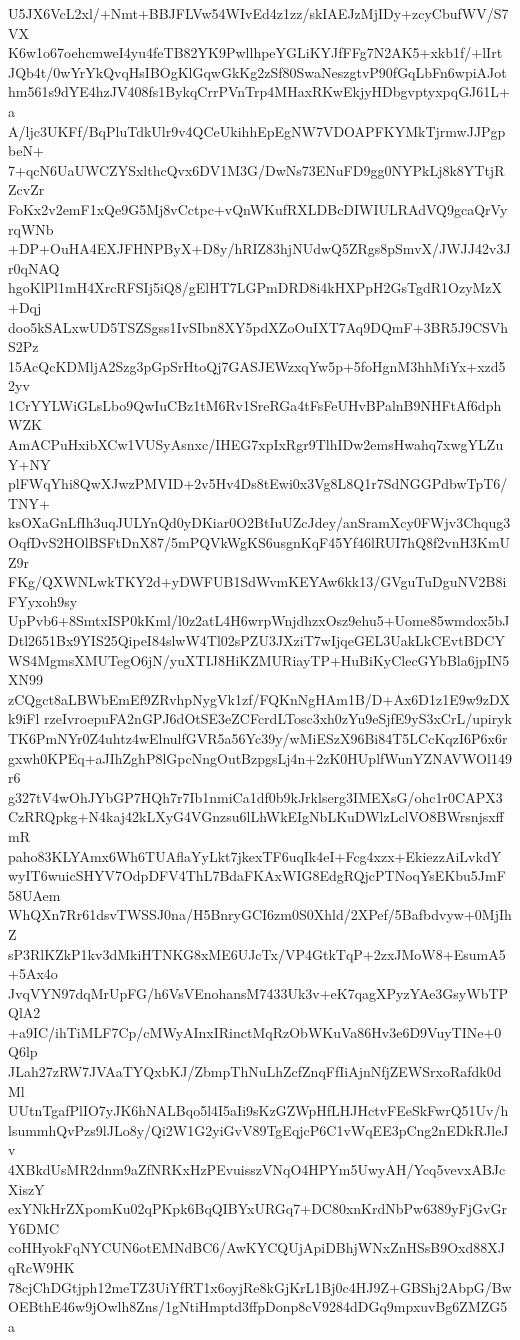 U5JX6VcL2xl/+Nmt+BBJFLVw54WIvEd4z1zz/skIAEJzMjIDy+zcyCbufWV/S7VX
K6w1o67oehcmweI4yu4feTB82YK9PwllhpeYGLiKYJfFFg7N2AK5+xkb1f/+lIrt
JQb4t/0wYrYkQvqHsIBOgKlGqwGkKg2zSf80SwaNeszgtvP90fGqLbFn6wpiAJot
hm561s9dYE4hzJV408fs1BykqCrrPVnTrp4MHaxRKwEkjyHDbgvptyxpqGJ61L+a
A/ljc3UKFf/BqPluTdkUlr9v4QCeUkihhEpEgNW7VDOAPFKYMkTjrmwJJPgpbeN+
7+qcN6UaUWCZYSxlthcQvx6DV1M3G/DwNs73ENuFD9gg0NYPkLj8k8YTtjRZcvZr
FoKx2v2emF1xQe9G5Mj8vCctpc+vQnWKufRXLDBcDIWIULRAdVQ9gcaQrVyrqWNb
+DP+OuHA4EXJFHNPByX+D8y/hRIZ83hjNUdwQ5ZRgs8pSmvX/JWJJ42v3Jr0qNAQ
hgoKlPl1mH4XrcRFSIj5iQ8/gElHT7LGPmDRD8i4kHXPpH2GsTgdR1OzyMzX+Dqj
doo5kSALxwUD5TSZSgss1IvSIbn8XY5pdXZoOuIXT7Aq9DQmF+3BR5J9CSVhS2Pz
15AcQcKDMljA2Szg3pGpSrHtoQj7GASJEWzxqYw5p+5foHgnM3hhMiYx+xzd52yv
1CrYYLWiGLsLbo9QwIuCBz1tM6Rv1SreRGa4tFsFeUHvBPalnB9NHFtAf6dphWZK
AmACPuHxibXCw1VUSyAsnxc/IHEG7xpIxRgr9TlhIDw2emsHwahq7xwgYLZuY+NY
plFWqYhi8QwXJwzPMVID+2v5Hv4Ds8tEwi0x3Vg8L8Q1r7SdNGGPdbwTpT6/TNY+
ksOXaGnLfIh3uqJULYnQd0yDKiar0O2BtIuUZcJdey/anSramXcy0FWjv3Chqug3
OqfDvS2HOlBSFtDnX87/5mPQVkWgKS6usgnKqF45Yf46lRUI7hQ8f2vnH3KmUZ9r
FKg/QXWNLwkTKY2d+yDWFUB1SdWvmKEYAw6kk13/GVguTuDguNV2B8iFYyxoh9sy
UpPvb6+8SmtxISP0kKml/l0z2atL4H6wrpWnjdhzxOsz9ehu5+Uome85wmdox5bJ
Dtl2651Bx9YIS25QipeI84slwW4Tl02sPZU3JXziT7wIjqeGEL3UakLkCEvtBDCY
WS4MgmsXMUTegO6jN/yuXTIJ8HiKZMURiayTP+HuBiKyClecGYbBla6jpIN5XN99
zCQgct8aLBWbEmEf9ZRvhpNygVk1zf/FQKnNgHAm1B/D+Ax6D1z1E9w9zDXk9iFl
rzeIvroepuFA2nGPJ6dOtSE3eZCFcrdLTosc3xh0zYu9eSjfE9yS3xCrL/upiryk
TK6PmNYr0Z4uhtz4wElnulfGVR5a56Yc39y/wMiESzX96Bi84T5LCcKqzI6P6x6r
gxwh0KPEq+aJIhZghP8lGpcNngOutBzpgsLj4n+2zK0HUplfWunYZNAVWOl149r6
g327tV4wOhJYbGP7HQh7r7Ib1nmiCa1df0b9kJrklserg3IMEXsG/ohc1r0CAPX3
CzRRQpkg+N4kaj42kLXyG4VGnzsu6lLhWkEIgNbLKuDWlzLclVO8BWrsnjsxffmR
paho83KLYAmx6Wh6TUAflaYyLkt7jkexTF6uqIk4eI+Fcg4xzx+EkiezzAiLvkdY
wyIT6wuicSHYV7OdpDFV4ThL7BdaFKAxWIG8EdgRQjcPTNoqYsEKbu5JmF58UAem
WhQXn7Rr61dsvTWSSJ0na/H5BnryGCI6zm0S0Xhld/2XPef/5Bafbdvyw+0MjIhZ
sP3RlKZkP1kv3dMkiHTNKG8xME6UJcTx/VP4GtkTqP+2zxJMoW8+EsumA5+5Ax4o
JvqVYN97dqMrUpFG/h6VsVEnohansM7433Uk3v+eK7qagXPyzYAe3GsyWbTPQlA2
+a9IC/ihTiMLF7Cp/cMWyAInxIRinctMqRzObWKuVa86Hv3e6D9VuyTINe+0Q6lp
JLah27zRW7JVAaTYQxbKJ/ZbmpThNuLhZcfZnqFfIiAjnNfjZEWSrxoRafdk0dMl
UUtnTgafPlIO7yJK6hNALBqo5l4I5aIi9sKzGZWpHfLHJHctvFEeSkFwrQ51Uv/h
lsummhQvPzs9lJLo8y/Qi2W1G2yiGvV89TgEqjcP6C1vWqEE3pCng2nEDkRJleJv
4XBkdUsMR2dnm9aZfNRKxHzPEvuisszVNqO4HPYm5UwyAH/Ycq5vevxABJcXiszY
exYNkHrZXpomKu02qPKpk6BqQIBYxURGq7+DC80xnKrdNbPw6389yFjGvGrY6DMC
coHHyokFqNYCUN6otEMNdBC6/AwKYCQUjApiDBhjWNxZnHSsB9Oxd88XJqRcW9HK
78cjChDGtjph12meTZ3UiYfRT1x6oyjRe8kGjKrL1Bj0c4HJ9Z+GBShj2AbpG/Bw
OEBthE46w9jOwlh8Zns/1gNtiHmptd3ffpDonp8cV9284dDGq9mpxuvBg6ZMZG5a

